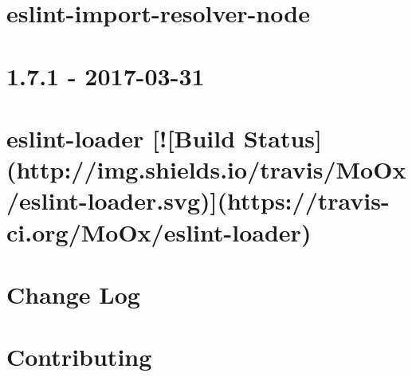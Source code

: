 \documentclass[twoside]{book}
\newcommand{\+}{\discretionary{\mbox{\scriptsize$\hookleftarrow$}}{}{}}
\begin{document}
\chapter{eslint-\/import-\/resolver-\/node}
\label{md__c_1_workspace_demo_src_main_script_node_modules_eslint-import-resolver-node__r_e_a_d_m_e}

\chapter{1.7.1 -\/ 2017-\/03-\/31}
\label{md__c_1_workspace_demo_src_main_script_node_modules_eslint-loader__c_h_a_n_g_e_l_o_g}

\chapter{eslint-\/loader \mbox{[}!\mbox{[}Build Status\mbox{]}(http\+://img.shields.\+io/travis/\+Mo\+Ox/eslint-\/loader.svg)\mbox{]}(https\+://travis-\/ci.org/\+Mo\+Ox/eslint-\/loader)}
\label{md__c_1_workspace_demo_src_main_script_node_modules_eslint-loader__r_e_a_d_m_e}

\chapter{Change Log}
\label{md__c_1_workspace_demo_src_main_script_node_modules_eslint-module-utils__c_h_a_n_g_e_l_o_g}

\chapter{Contributing}
\label{md__c_1_workspace_demo_src_main_script_node_modules_eslint-plugin-flowtype__c_o_n_t_r_i_b_u_t_i_n_g}

\end{document}
